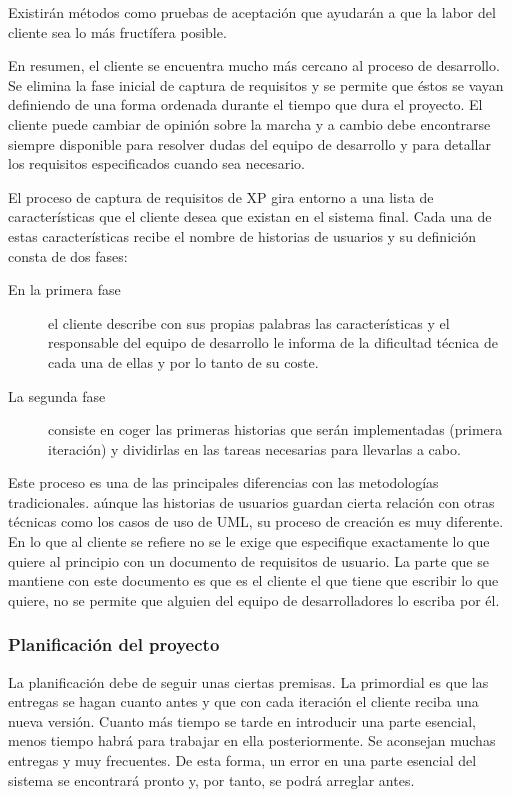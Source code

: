 \documentclass[12pt]{book} %
\begin{document}
			Existirán métodos como pruebas de aceptación que ayudarán a que la labor del cliente sea lo más fructífera posible.
			
			En resumen, el cliente se encuentra mucho más cercano al proceso de desarrollo. Se elimina la fase inicial de captura de requisitos 
			y se permite que éstos se vayan definiendo de una forma ordenada durante el tiempo que dura el proyecto. El cliente puede cambiar 
			de opinión sobre la marcha y a cambio debe encontrarse siempre disponible para resolver dudas del equipo de desarrollo y para detallar 
			los requisitos especificados cuando sea necesario. 
			
			El proceso de captura de requisitos de XP gira entorno a una lista de características que el cliente desea que existan en el sistema 
			final. Cada una de estas características recibe el nombre de historias de usuarios y su definición consta de dos fases:
			
			\begin{description}
				\item[En la primera fase] el cliente describe con sus propias palabras las características y el responsable del equipo de 
					desarrollo le informa de la dificultad técnica de cada una de ellas y por lo tanto de su coste.
				\item[La segunda fase] consiste en coger las primeras historias que serán implementadas (primera iteración) y dividirlas 
					en las tareas necesarias para llevarlas a cabo.
			\end{description}
			
			Este proceso es una de las principales diferencias con las metodologías tradicionales. a\'unque las historias de usuarios guardan 
			cierta relación con otras técnicas como los casos de uso de UML, su proceso de creación es muy diferente. En lo que al cliente se 
			refiere no se le exige que especifique exactamente lo que quiere al principio con un documento de requisitos de usuario. La parte 
			que se mantiene con este documento es que es el cliente el que tiene que escribir lo que quiere, no se permite que alguien del 
			equipo de desarrolladores lo escriba por él.
			
		\subsubsection{Planificación del proyecto}
			 La planificación debe de seguir unas ciertas premisas. La primordial es que las entregas se hagan cuanto antes y que con cada 
			 iteración el cliente reciba una nueva versión. Cuanto más tiempo se tarde en introducir una parte esencial, menos tiempo habrá
			 para trabajar en ella posteriormente. Se aconsejan muchas entregas y muy frecuentes. De esta forma, un error en una parte esencial 
			 del sistema se encontrará pronto y, por tanto, se podrá arreglar antes.\\
			 
\end{document}
